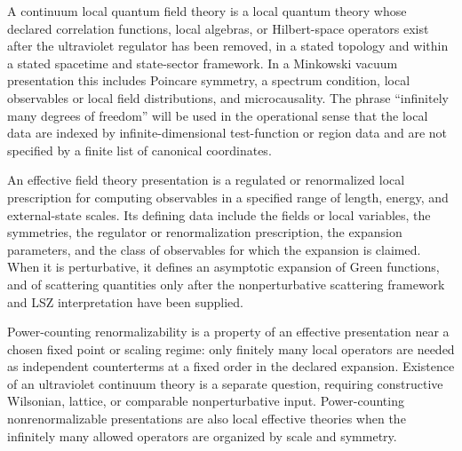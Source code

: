 \begin{definition}
\label{def:continuum-local-qft-opening}
  A continuum local quantum field theory is a local quantum theory whose
  declared correlation functions, local algebras, or Hilbert-space operators
  exist after the ultraviolet regulator has been removed, in a stated
  topology and within a stated spacetime and state-sector framework.  In a
  Minkowski vacuum presentation this includes Poincare symmetry, a spectrum
  condition, local observables or local field distributions, and
  microcausality.  The phrase ``infinitely many degrees of freedom'' will be
  used in the operational sense that the local data are indexed by
  infinite-dimensional test-function or region data and are not specified by a
  finite list of canonical coordinates.
\end{definition}

\begin{definition}
\label{def:effective-field-theory-presentation-opening}
  An effective field theory presentation is a regulated or renormalized local
  prescription for computing observables in a specified range of length,
  energy, and external-state scales.  Its defining data include the fields or
  local variables, the symmetries, the regulator or renormalization
  prescription, the expansion parameters, and the class of observables for
  which the expansion is claimed.  When it is perturbative, it defines an
  asymptotic expansion of Green functions, and of scattering quantities only
  after the nonperturbative scattering framework and LSZ interpretation have
  been supplied.
\end{definition}

Power-counting renormalizability is a property of an effective presentation
near a chosen fixed point or scaling regime: only finitely many local
operators are needed as independent counterterms at a fixed order in the
declared expansion.  Existence of an ultraviolet continuum theory is a
separate question, requiring constructive Wilsonian, lattice, or comparable
nonperturbative input.  Power-counting nonrenormalizable presentations are also
local effective theories when the infinitely many allowed operators are
organized by scale and symmetry.

